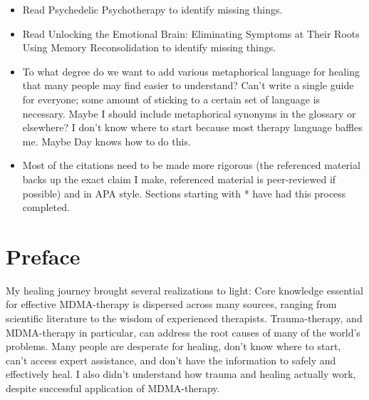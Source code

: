 \documentclass[12pt,letterpaper]{article}
\begin{document}
\begin{itemize}
    \item Read Psychedelic Psychotherapy to identify missing things.
    \item Read Unlocking the Emotional Brain: Eliminating Symptoms at Their Roots Using Memory Reconsolidation to identify missing things.
    \item To what degree do we want to add various metaphorical language for healing that many people may find easier to understand? Can't write a single guide for everyone; some amount of sticking to a certain set of language is necessary. Maybe I should include metaphorical synonyms in the glossary or elsewhere? I don't know where to start because most therapy language baffles me. Maybe Day knows how to do this.
    \item Most of the citations need to be made more rigorous (the referenced material backs up the exact claim I make, referenced material is peer-reviewed if possible) and in APA style. Sections starting with * have had this process completed.
\end{itemize}
\section*{Preface}

My healing journey brought several realizations to light: Core knowledge essential for effective MDMA-therapy is dispersed across many sources, ranging from scientific literature to the wisdom of experienced therapists. Trauma-therapy, and MDMA-therapy in particular, can address the root causes of many of the world's problems. Many people are desperate for healing, don't know where to start, can't access expert assistance, and don't have the information to safely and effectively heal. I also didn't understand how trauma and healing actually work, despite successful application of MDMA-therapy. 
\end{document}
